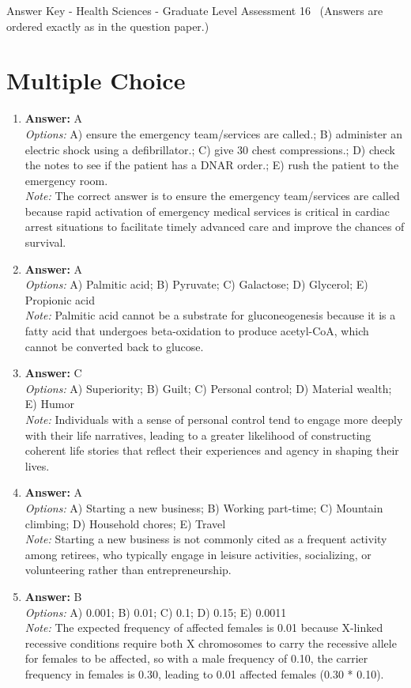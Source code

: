 \documentclass[12pt]{article}
\begin{document}
\begin{center}
Answer Key - Health Sciences - Graduate Level Assessment 16 \
\small (Answers are ordered exactly as in the question paper.)
\end{center}

\section*{Multiple Choice}
\begin{enumerate}[label=\arabic*.]
\item \textbf{Answer:} A
\\ \textit{Options:} A) ensure the emergency team/services are called.; B) administer an electric shock using a defibrillator.; C) give 30 chest compressions.; D) check the notes to see if the patient has a DNAR order.; E) rush the patient to the emergency room.
\\ \textit{Note:} The correct answer is to ensure the emergency team/services are called because rapid activation of emergency medical services is critical in cardiac arrest situations to facilitate timely advanced care and improve the chances of survival.
\item \textbf{Answer:} A
\\ \textit{Options:} A) Palmitic acid; B) Pyruvate; C) Galactose; D) Glycerol; E) Propionic acid
\\ \textit{Note:} Palmitic acid cannot be a substrate for gluconeogenesis because it is a fatty acid that undergoes beta-oxidation to produce acetyl-CoA, which cannot be converted back to glucose.
\item \textbf{Answer:} C
\\ \textit{Options:} A) Superiority; B) Guilt; C) Personal control; D) Material wealth; E) Humor
\\ \textit{Note:} Individuals with a sense of personal control tend to engage more deeply with their life narratives, leading to a greater likelihood of constructing coherent life stories that reflect their experiences and agency in shaping their lives.
\item \textbf{Answer:} A
\\ \textit{Options:} A) Starting a new business; B) Working part-time; C) Mountain climbing; D) Household chores; E) Travel
\\ \textit{Note:} Starting a new business is not commonly cited as a frequent activity among retirees, who typically engage in leisure activities, socializing, or volunteering rather than entrepreneurship.
\item \textbf{Answer:} B
\\ \textit{Options:} A) 0.001; B) 0.01; C) 0.1; D) 0.15; E) 0.0011
\\ \textit{Note:} The expected frequency of affected females is 0.01 because X-linked recessive conditions require both X chromosomes to carry the recessive allele for females to be affected, so with a male frequency of 0.10, the carrier frequency in females is 0.30, leading to 0.01 affected females (0.30 * 0.10).
\end{enumerate}
\end{document}
